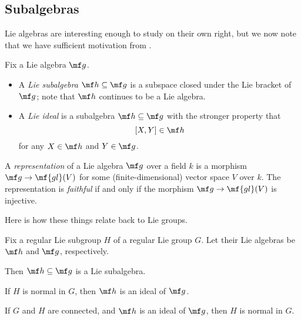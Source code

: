 \documentclass[../notes.tex]{subfiles}
\begin{document}
\subsection{Subalgebras}
Lie algebras are interesting enough to study on their own right, but we now note that we have sufficient motivation from .
\begin{defihelper}  
	Fix a Lie algebra $\mf g$.
	\begin{itemize}
		\item A \textit{Lie subalgebra} $\mf h\subseteq\mf g$ is a subspace closed under the Lie bracket of $\mf g$; note that $\mf h$ continues to be a Lie algebra.
		\item A \textit{Lie ideal} is a subalgebra $\mf h\subseteq\mf g$ with the stronger property that
		\[[X,Y]\in\mf h\]
		for any $X\in\mf h$ and $Y\in\mf g$.
	\end{itemize}
\end{defihelper}
\begin{definition}[representation] 
	A \textit{representation} of a Lie algebra $\mf g$ over a field $k$ is a morphism $\mf g\to\mf{gl}(V)$ for some (finite-dimensional) vector space $V$ over $k$. The representation is \textit{faithful} if and only if the morphism $\mf g\to\mf{gl}(V)$ is injective.
\end{definition}
Here is how these things relate back to Lie groups.
\begin{proposition}
	Fix a regular Lie subgroup $H$ of a regular Lie group $G$. Let their Lie algebras be $\mf h$ and $\mf g$, respectively.
	\begin{listalph}
		\item Then $\mf h\subseteq\mf g$ is a Lie subalgebra.
		\item If $H$ is normal in $G$, then $\mf h$ is an ideal of $\mf g$.
		\item If $G$ and $H$ are connected, and $\mf h$ is an ideal of $\mf g$, then $H$ is normal in $G$.
	\end{listalph}
\end{proposition}
\end{document}
